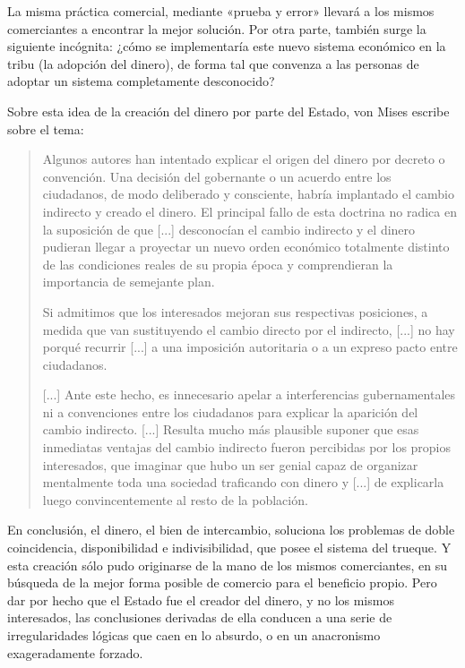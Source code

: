 \documentclass[12pt,a4paper,twoside]{book}
\begin{document}
La misma práctica comercial, mediante «prueba y error» llevará a los mismos comerciantes a encontrar la mejor solución. Por otra parte, también surge la siguiente incógnita: ¿cómo se implementaría este nuevo sistema económico en la tribu (la adopción del dinero), de forma tal que convenza a las personas de adoptar un sistema completamente desconocido?

Sobre esta idea de la creación del dinero por parte del Estado, von Mises escribe sobre el tema:

\begin{quotation}
Algunos autores han intentado explicar el origen del dinero por decreto o convención. Una decisión del gobernante o un acuerdo entre los ciudadanos, de modo deliberado y consciente, habría implantado el cambio indirecto y creado el dinero. El principal fallo de esta doctrina no radica en la suposición de que [...] desconocían el cambio indirecto y el dinero pudieran llegar a proyectar un nuevo orden económico totalmente distinto de las condiciones reales de su propia época y comprendieran la importancia de semejante plan.

Si admitimos que los interesados mejoran sus respectivas posiciones, a medida que van sustituyendo el cambio directo por el indirecto, [...] no hay porqué recurrir [...] a una imposición autoritaria o a un expreso pacto entre ciudadanos.

[...] Ante este hecho, es innecesario apelar a interferencias gubernamentales ni a convenciones entre los ciudadanos para explicar la aparición del cambio indirecto. [...] Resulta mucho más plausible suponer que esas inmediatas ventajas del cambio indirecto fueron percibidas por los propios interesados, que imaginar que hubo un ser genial capaz de organizar mentalmente toda una sociedad traficando con dinero y [...] de explicarla luego convincentemente al resto de la población. \cite[pág. 488]{mises:lah}
\end{quotation}

En conclusión, el dinero, el bien de intercambio, soluciona los problemas de doble coincidencia, disponibilidad e indivisibilidad, que posee el sistema del trueque. Y esta creación sólo pudo originarse de la mano de los mismos comerciantes, en su búsqueda de la mejor forma posible de comercio para el beneficio propio. Pero dar por hecho que el Estado fue el creador del dinero, y no los mismos interesados, las conclusiones derivadas de ella conducen a una serie de irregularidades lógicas que caen en lo absurdo, o en un anacronismo exageradamente forzado.
\end{document}
